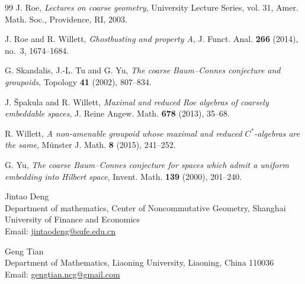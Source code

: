 \documentclass[11pt,a4paper]{article}
\theoremstyle{definition}\newtheorem{definition}[theorem]{Definition}
\theoremstyle{remark}\newtheorem{remark}[theorem]{Remark}
\begin{document}
\begin{thebibliography}{99}
J. Roe,
\emph{Lectures on coarse geometry},
University Lecture Series, vol. 31, Amer. Math. Soc., Providence, RI, 2003.

J. Roe and R. Willett,
\emph{Ghostbusting and property A},
J. Funct. Anal. \textbf{266} (2014), no.~3, 1674--1684.

G. Skandalis, J.-L. Tu and G. Yu,
\emph{The coarse Baum--Connes conjecture and groupoids},
Topology \textbf{41} (2002), 807--834.

J. \v{S}pakula and R. Willett,
\emph{Maximal and reduced Roe algebras of coarsely embeddable spaces},
J. Reine Angew. Math. \textbf{678} (2013), 35--68.

R. Willett,
\emph{A non-amenable groupoid whose maximal and reduced $C^*$-algebras are the same},
M\"unster J. Math. \textbf{8} (2015), 241--252.

G. Yu,
\emph{The coarse Baum--Connes conjecture for spaces which admit a uniform embedding into Hilbert space},
Invent. Math. \textbf{139} (2000), 201--240.

\end{thebibliography}

\vspace{1cm}

\noindent Jintao Deng\\
\noindent Department of mathematics, Center of Noncommutative Geometry, Shanghai University of Finance and Economics\\
\noindent Email: \url{jintaodeng@sufe.edu.cn}
  
\vspace{1cm}

\noindent Geng Tian\\
\noindent Department of Mathematics, Liaoning University, Liaoning, China 110036\\
\noindent Email: \url{gengtian.ncg@gmail.com}
\end{document}
